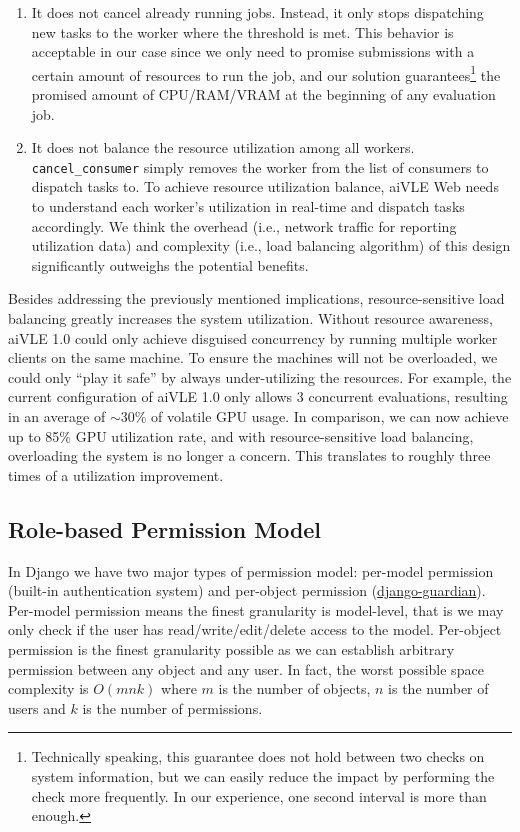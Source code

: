 \begin{enumerate}
    \item It does not cancel already running jobs. Instead, it only stops dispatching new tasks to the worker where the threshold is met. This behavior is acceptable in our case since we only need to promise submissions with a certain amount of resources to run the job, and our solution guarantees\footnote{Technically speaking, this guarantee does not hold between two checks on system information, but we can easily reduce the impact by performing the check more frequently. In our experience, one second interval is more than enough.} the promised amount of CPU/RAM/VRAM at the beginning of any evaluation job.
    \item It does not balance the resource utilization among all workers. \texttt{cancel\_consumer} simply removes the worker from the list of consumers to dispatch tasks to. To achieve resource utilization balance, aiVLE Web needs to understand each worker's utilization in real-time and dispatch tasks accordingly. We think the overhead (i.e., network traffic for reporting utilization data) and complexity (i.e., load balancing algorithm) of this design significantly outweighs the potential benefits.
\end{enumerate}

Besides addressing the previously mentioned implications, resource-sensitive load balancing greatly increases the system utilization. Without resource awareness, aiVLE 1.0 could only achieve disguised concurrency by running multiple worker clients on the same machine. To ensure the machines will not be overloaded, we could only ``play it safe'' by always under-utilizing the resources. For example, the current configuration of aiVLE 1.0 only allows 3 concurrent evaluations, resulting in an average of $\sim30\%$ of volatile GPU usage. In comparison, we can now achieve up to 85\% GPU utilization rate, and with resource-sensitive load balancing, overloading the system is no longer a concern. This translates to roughly three times of a utilization improvement.

\subsection{Role-based Permission Model}
\label{ss:aivle-web-permission-model}
In Django we have two major types of permission model: per-model permission (built-in authentication system) and per-object permission (\href{https://github.com/django-guardian/django-guardian}{django-guardian}). Per-model permission means the finest granularity is model-level, that is we may only check if the user has read/write/edit/delete access to the model. Per-object permission is the finest granularity possible as we can establish arbitrary permission between any object and any user. In fact, the worst possible space complexity is $O(mnk)$ where $m$ is the number of objects, $n$ is the number of users and $k$ is the number of permissions.

